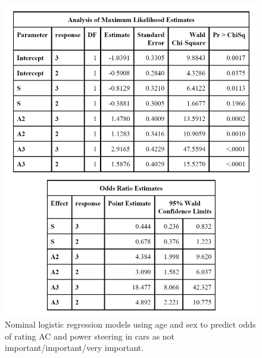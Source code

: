 \documentclass[12pt]{../notes}
\begin{document}
\begin{figure}[H]
\includegraphics[width=\textwidth]{../figures/module5/multi_logistic_regression.png}
\caption{Nominal logistic regression models using age and sex to predict odds of rating AC and power steering in cars as not important/important/very important.}
\label{fig:logit_output}
\end{figure}





\end{document}
